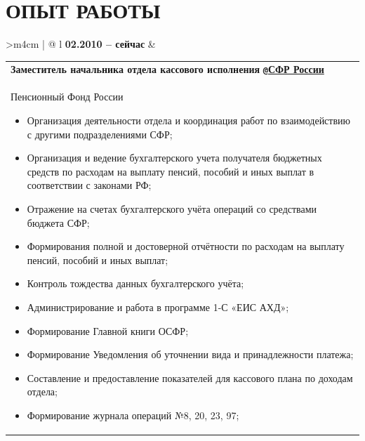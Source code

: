\documentclass{anisyan-resume}
\begin{document}
	\vspace{5pt}
	\section{\textbf{ОПЫТ РАБОТЫ}}
	\vspace{5pt}
	\renewcommand\arraystretch{0.5}
	\begin{tabularx}{\textwidth}{>{\quad}m{4cm} | @{\timelinebullet} l}
		\normalsize\textbf{02.2010 -- сейчас}
		&
		\renewcommand\arraystretch{1}
		\begin{tabular}[t]{ p{15cm} }
		\large{\textbf{Заместитель начальника отдела кассового исполнения}} \texttt{\textbf{@}}\href{https://es.pfrf.ru/}{\textbf{СФР России}}\\
		\normalsize{Пенсионный Фонд России}
		\renewcommand\labelitemi{{\boldmath$\cdot$}}
		\begin{itemize}[noitemsep, topsep=5pt, parsep=0pt, partopsep=0pt]
			\item {\small Организация деятельности отдела и координация работ по взаимодействию с другими подразделениями СФР;}
			\item {\small Организация и ведение бухгалтерского учета получателя бюджетных средств по расходам на выплату пенсий, пособий и иных выплат в соответствии с законами РФ;}
			\item {\small Отражение на счетах бухгалтерского учёта операций со средствами бюджета СФР;}
			\item {\small Формирования полной и достоверной отчётности по расходам на выплату пенсий, пособий и иных выплат;}
			\item {\small Контроль тождества данных бухгалтерского учёта;}
			\item {\small Администрирование и работа в программе 1-С «ЕИС АХД»;}
			\item {\small Формирование Главной книги ОСФР;}
			\item {\small Формирование Уведомления об уточнении вида и принадлежности платежа;}
			\item {\small Составление и предоставление показателей для кассового плана по доходам отдела;}
			\item {\small Формирование журнала операций №8, 20, 23, 97;}
		\end{itemize}
		\end{tabular} \\


\end{tabularx}
\end{document}
